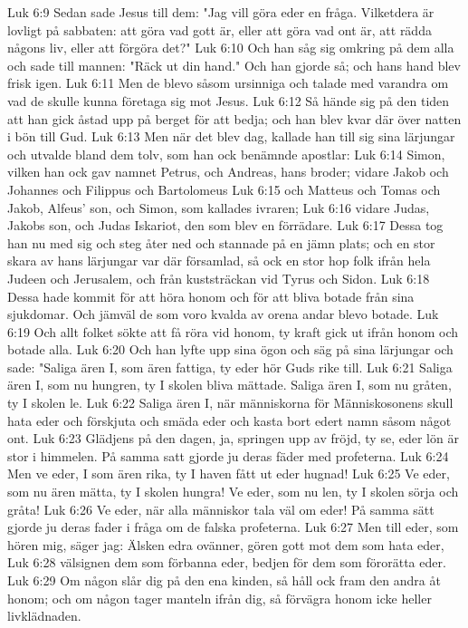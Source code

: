 Luk 6:9  Sedan sade Jesus till dem: "Jag vill göra eder en fråga. Vilketdera är lovligt på sabbaten: att göra vad gott är, eller att göra vad ont är, att rädda någons liv, eller att förgöra det?"
Luk 6:10  Och han såg sig omkring på dem alla och sade till mannen: "Räck ut din hand." Och han gjorde så; och hans hand blev frisk igen.
Luk 6:11  Men de blevo såsom ursinniga och talade med varandra om vad de skulle kunna företaga sig mot Jesus.
Luk 6:12  Så hände sig på den tiden att han gick åstad upp på berget för att bedja; och han blev kvar där över natten i bön till Gud.
Luk 6:13  Men när det blev dag, kallade han till sig sina lärjungar och utvalde bland dem tolv, som han ock benämnde apostlar:
Luk 6:14  Simon, vilken han ock gav namnet Petrus, och Andreas, hans broder; vidare Jakob och Johannes och Filippus och Bartolomeus
Luk 6:15  och Matteus och Tomas och Jakob, Alfeus' son, och Simon, som kallades ivraren;
Luk 6:16  vidare Judas, Jakobs son, och Judas Iskariot, den som blev en förrädare.
Luk 6:17  Dessa tog han nu med sig och steg åter ned och stannade på en jämn plats; och en stor skara av hans lärjungar var där församlad, så ock en stor hop folk ifrån hela Judeen och Jerusalem, och från kuststräckan vid Tyrus och Sidon.
Luk 6:18  Dessa hade kommit för att höra honom och för att bliva botade från sina sjukdomar. Och jämväl de som voro kvalda av orena andar blevo botade.
Luk 6:19  Och allt folket sökte att få röra vid honom, ty kraft gick ut ifrån honom och botade alla.
Luk 6:20  Och han lyfte upp sina ögon och säg på sina lärjungar och sade: "Saliga ären I, som ären fattiga, ty eder hör Guds rike till.
Luk 6:21  Saliga ären I, som nu hungren, ty I skolen bliva mättade. Saliga ären I, som nu gråten, ty I skolen le.
Luk 6:22  Saliga ären I, när människorna för Människosonens skull hata eder och förskjuta och smäda eder och kasta bort edert namn såsom något ont.
Luk 6:23  Glädjens på den dagen, ja, springen upp av fröjd, ty se, eder lön är stor i himmelen. På samma satt gjorde ju deras fäder med profeterna.
Luk 6:24  Men ve eder, I som ären rika, ty I haven fått ut eder hugnad!
Luk 6:25  Ve eder, som nu ären mätta, ty I skolen hungra! Ve eder, som nu len, ty I skolen sörja och gråta!
Luk 6:26  Ve eder, när alla människor tala väl om eder! På samma sätt gjorde ju deras fader i fråga om de falska profeterna.
Luk 6:27  Men till eder, som hören mig, säger jag: Älsken edra ovänner, gören gott mot dem som hata eder,
Luk 6:28  välsignen dem som förbanna eder, bedjen för dem som förorätta eder.
Luk 6:29  Om någon slår dig på den ena kinden, så håll ock fram den andra åt honom; och om någon tager manteln ifrån dig, så förvägra honom icke heller livklädnaden.
